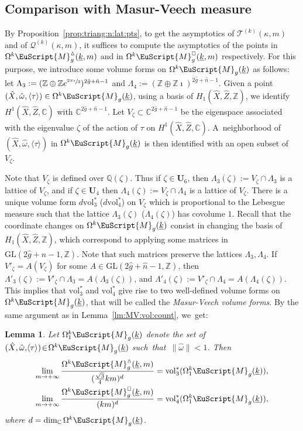 \documentclass[10pt]{amsart}
\let\mathcal\EuScript
\theoremstyle{plain}
\newtheorem{Lemma}[Theorem]{Lemma}
\theoremstyle{definition}
\def\C{\mathbb{C}}
\newcommand\Z{\mathbb{Z}}
\newcommand{\Q}{\mathbb{Q}}
\newcommand{\Ub}{\mathbf{U}}
\newcommand{\Mcal}{\mathcal{M}}
\newcommand{\QQ}{\mathscr{Q}}
\newcommand{\TT}{\mathscr{T}}
\newcommand{\GL}{\mathrm{GL}}
\newcommand{\vol}{\mathrm{vol}}
\newcommand{\hg}{\hat{g}}
\newcommand{\hn}{\hat{n}}
\newcommand{\hX}{\hat{X}}
\newcommand{\hZ}{\hat{Z}}
\newcommand{\homg}{\hat{\omega}}
\let\ul\underline
\newcommand{\Skdiff}{\Omega^k\mathcal{M}_{g}(\ul{k})}
\newcommand{\Skdiffi}{\Omega^k_1\mathcal{M}_{g}(\ul{k})}
\newcommand{\Tkdiffm}{\Omega^k\Mcal^\vartriangle_g(\ul{k},m)}
\newcommand{\Qkdiffm}{\Omega^k\Mcal^{\scriptscriptstyle\square}_g(\ul{k},m)}
\begin{document}
\subsection{Comparison with Masur-Veech measure}\label{sec:compare:MV:vol}
By Proposition~\ref{prop:triang:n:lat:pts}, to get the asymptotics of $\TT^{(k)}(\kappa,m)$ and of $\QQ^{(k)}(\kappa,m)$, it suffices to compute the asymptotics of the points in $\Tkdiffm$ and in $\Qkdiffm$ respectively. For this purpose, we introduce some volume forms on $\Skdiff$ as follows: let $\Lambda_3:=(\Z\oplus\Z e^{\sfrac{2\pi\imath}{3}})^{2\hg+\hn-1}$ and $\Lambda_4:=(\Z\oplus\Z\imath)^{2\hg+\hn-1}$.
Given a point $(\hX,\homg,\langle\tau\rangle) \in \Skdiff$, using a basis of $H_1(\hX,\hZ,\Z)$, we identify $H^1(\hX,\hZ,\C)$ with $\C^{2\hg+\hn-1}$.
Let $V_\zeta \subset \C^{2\hg+\hn-1}$ be the eigenspace associated with the eigenvalue $\zeta$ of the action of $\tau$ on $H^1(\hX,\hZ,\C)$.
A~neighborhood of $(\hX,\homg,\langle\tau\rangle)$ in $\Skdiff$ is then identified with an open subset of~$V_\zeta$.

Note that $V_\zeta$ is defined over $\Q(\zeta)$. Thus if $\zeta \in \Ub_6$, then $\Lambda_3(\zeta):=V_\zeta\cap\Lambda_3$ is a lattice of $V_\zeta$, and if $\zeta\in \Ub_4$ then $\Lambda_4(\zeta):=V_\zeta\cap\Lambda_4$ is a lattice of $V_\zeta$.
There is a unique volume form $d\vol_3^*$ (\resp $d\vol_4^*$) on $V_\zeta$ which is proportional to the Lebesgue measure such that the lattice $\Lambda_3(\zeta)$ (\resp $\Lambda_4(\zeta)$) has covolume $1$.
Recall that the coordinate changes on $\Skdiff$ consist in changing the basis of $H_1(\hX,\hZ,\Z)$, which correspond to applying some matrices in $\GL(2\hg+\hn-1,\Z)$. Note that such matrices preserve the lattices $\Lambda_3,\Lambda_4$. If $V'_\zeta=A(V_\zeta)$ for some $A\in \GL(2\hg+\hn-1,\Z)$, then $\Lambda'_3(\zeta):=V'_\zeta\cap\Lambda_3=A(\Lambda_3(\zeta))$, and $\Lambda'_4(\zeta):=V'_\zeta\cap\Lambda_4=A(\Lambda_4(\zeta))$.
This implies that $\vol_3^*$ and $\vol_4^*$ give rise to two well-defined volume forms on $\Skdiff$, that will be called the \emph{Masur-Veech volume forms}. By the same argument as in Lemma~\ref{lm:MV:vol:count}, we~get:
\begin{Lemma}\label{lm:MV:asymp:triang} Let $\Skdiffi$ denote the set of $(\hX,\homg,\!\langle\tau\rangle)\!\in\!\Skdiff$ such~that~\hbox{$\|\homg\| \!<\!1$}. Then
\begin{align}
\label{eqn:asymp:n:vol:tria} \lim_{m\to +\infty}\frac{\Tkdiffm}{(\frac{\sqrt{3}}{4}km)^d} & = \vol_3^*(\Skdiffi), \\
\label{eq:asymp:n:vol:quad} \lim_{m\to +\infty}\frac{\Qkdiffm}{(km)^d} & = \vol_4^*(\Skdiffi),
\end{align}
where $d=\dim_\C\Skdiff$.
\end{Lemma}
\end{document}
